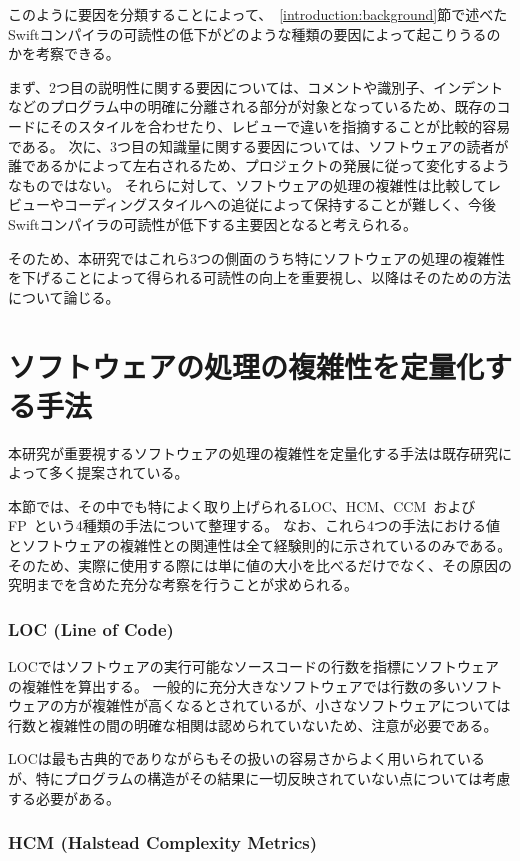 このように要因を分類することによって、~\ref{introduction:background}節で述べたSwiftコンパイラの可読性の低下がどのような種類の要因によって起こりうるのかを考察できる。

まず、2つ目の説明性に関する要因については、コメントや識別子、インデントなどのプログラム中の明確に分離される部分が対象となっているため、既存のコードにそのスタイルを合わせたり、レビューで違いを指摘することが比較的容易である。
次に、3つ目の知識量に関する要因については、ソフトウェアの読者が誰であるかによって左右されるため、プロジェクトの発展に従って変化するようなものではない。
それらに対して、ソフトウェアの処理の複雑性は比較してレビューやコーディングスタイルへの追従によって保持することが難しく、今後Swiftコンパイラの可読性が低下する主要因となると考えられる。

そのため、本研究ではこれら3つの側面のうち特にソフトウェアの処理の複雑性を下げることによって得られる可読性の向上を重要視し、以降はそのための方法について論じる。


\section{ソフトウェアの処理の複雑性を定量化する手法}
\label{issue:method}

本研究が重要視するソフトウェアの処理の複雑性を定量化する手法は既存研究によって多く提案されている。

本節では、その中でも特によく取り上げられるLOC、HCM、CCM~\cite{yu}およびFP~\cite{symons}という4種類の手法について整理する。
なお、これら4つの手法における値とソフトウェアの複雑性との関連性は全て経験則的に示されているのみである。
そのため、実際に使用する際には単に値の大小を比べるだけでなく、その原因の究明までを含めた充分な考察を行うことが求められる。

\subsubsection{LOC (Line of Code)}

LOCではソフトウェアの実行可能なソースコードの行数を指標にソフトウェアの複雑性を算出する。
一般的に充分大きなソフトウェアでは行数の多いソフトウェアの方が複雑性が高くなるとされているが、小さなソフトウェアについては行数と複雑性の間の明確な相関は認められていないため、注意が必要である。

LOCは最も古典的でありながらもその扱いの容易さからよく用いられているが、特にプログラムの構造がその結果に一切反映されていない点については考慮する必要がある。

\subsubsection{HCM (Halstead Complexity Metrics)}


